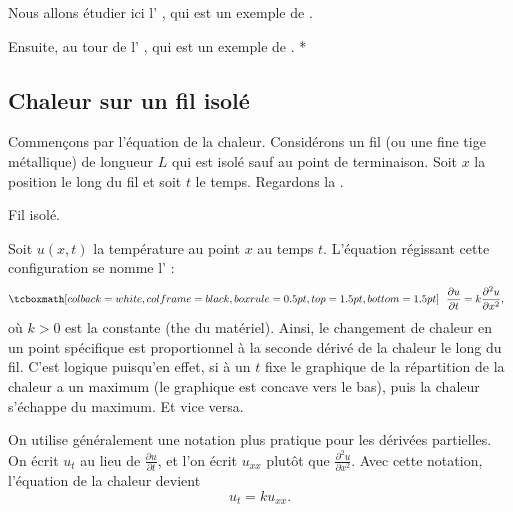 Nous allons étudier ici l'
\emph{}, qui est un exemple de \emph{}.  

Ensuite, au tour de l'
\emph{}, qui est un exemple de \emph{}.  
*%

\subsection{Chaleur sur un fil isolé}

Commençons par l'équation de la chaleur.
Considérons un fil (ou une fine tige métallique) de longueur $ L $
qui est isolé sauf au point de terminaison.  Soit $ x $ la position le long du fil et soit $ t $ le temps.  Regardons la .

\begin{myfig}
\capstart
{}
\caption{Fil isolé.\label{heat:wirefig}}
\end{myfig}

Soit $u(x,t)$ la température au point $ x $ au temps $ t $.
L'équation régissant cette configuration se nomme l' \emph{}:
\begin{equation*}
\mybxbg{~~
\frac{\partial u}{\partial t} =
k \frac{\partial^2 u}{\partial x^2} ,
~~}
\end{equation*}
où $k > 0$ est la constante (the \emph{} du matériel).
Ainsi, le changement de chaleur en un point spécifique est proportionnel à la seconde
dérivé de la chaleur le long du fil.  C'est logique puisqu'en effet,
si à un $ t $ fixe le graphique de la répartition de la chaleur a un maximum (le graphique est concave vers le bas),
puis la chaleur s'échappe du maximum.  Et vice versa.

On utilise généralement une notation plus pratique pour les dérivées partielles.
On écrit $ u_t $ au lieu de $\frac{\partial u}{\partial t}$,
et l'on écrit $u_{xx}$ plutôt que $\frac{\partial^2 u}{\partial x^2}$.
Avec cette notation,  l'équation de la chaleur devient 
\begin{equation*}
u_t = k u_{xx} .
\end{equation*}

